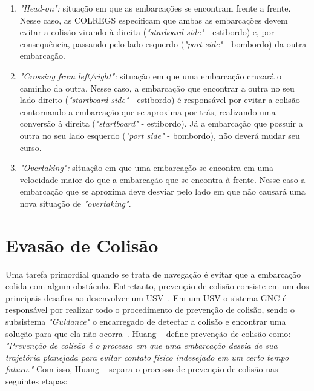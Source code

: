         \begin{enumerate}
            \item \textit{"Head-on":} situação em que as embarcações se encontram frente a frente. Nesse caso, as COLREGS especificam que ambas as embarcações devem evitar a colisão virando à direita  (\textit{"starboard side"} - estibordo) e, por consequência, passando pelo lado esquerdo (\textit{"port side"} - bombordo) da outra embarcação.
            
            \item \textit{"Crossing from left/right":} situação em que uma embarcação cruzará o caminho da outra. Nesse caso, a embarcação que encontrar a outra no seu lado direito (\textit{"startboard side"} - estibordo) é responsável por evitar a colisão contornando a embarcação que se aproxima por trás, realizando uma conversão à direita (\textit{"startboard"} - estibordo). Já a embarcação que possuir a outra no seu lado esquerdo (\textit{"port side"} - bombordo), não deverá mudar seu curso.
            
            \item \textit{"Overtaking":} situação em que uma embarcação se encontra em uma velocidade maior do que a embarcação que se encontra à frente. Nesse caso a embarcação que se aproxima deve desviar pelo lado em que não causará uma nova situação de \textit{"overtaking"}.
        \end{enumerate}
    
    \section{Evasão de Colisão}\label{subchap2:prev_col}
        Uma tarefa primordial quando se trata de navegação é evitar que a embarcação colida com algum obstáculo. Entretanto, prevenção de colisão consiste em um dos principais desafios ao desenvolver um USV~\cite{JURAK2020}. Em um USV o sistema GNC é responsável por realizar todo o procedimento de prevenção de colisão, sendo o subsistema \textit{"Guidance"} o encarregado de detectar a colisão e encontrar uma solução para que ela não ocorra~\cite{HUANG2020451}.
        Huang \etal~\cite[p.451]{HUANG2020451} define prevenção de colisão como: \textit{"Prevenção de colisão é o processo em que uma embarcação desvia de sua trajetória planejada para evitar contato físico indesejado em um certo tempo futuro."} Com isso, Huang \etal~\cite{HUANG2020451} separa o processo de prevenção de colisão nas seguintes etapas: 
        
